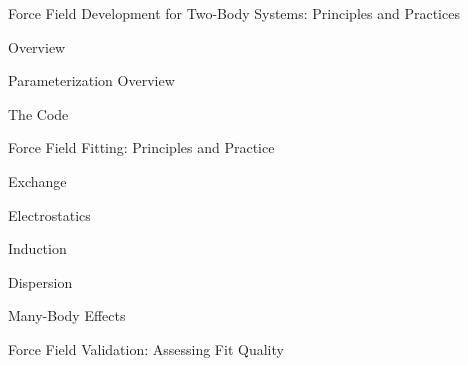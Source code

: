 
\begin{chapter}{Force Field Development for Two-Body Systems: Principles and
Practices}
\label{ch:pointer}

\newcommand{\vmultipolecolor}{\ensuremath{\sum\limits_{\textcolor{mon}{tu}}\textcolor{mon}{Q_t^i}T_{tu}\textcolor{mon}{Q_u^j}}\xspace}

\begin{section}{Overview}

\end{section}



\begin{section}{Parameterization Overview}

\end{section}

\begin{section}{The \pointer Code}
\label{sec:pointer-pointer}

\end{section}

\begin{section}{Force Field Fitting: Principles and Practice}
\label{sec:pointer-fitting}

\begin{subsection}{Exchange}
\label{sec:pointer-exchange}

\end{subsection}
\begin{subsection}{Electrostatics}
\label{sec:pointer-electrostatics}

\end{subsection}
\begin{subsection}{Induction}
\label{sec:pointer-induction}

\end{subsection}
\begin{subsection}{Dispersion}
\label{sec:pointer-dispersion}

\end{subsection}
\begin{subsection}{Many-Body Effects}

\end{subsection}
\end{section}

\begin{section}{Force Field Validation: Assessing Fit Quality}
\label{sec:pointer-validate}

\end{section}


\end{chapter}
